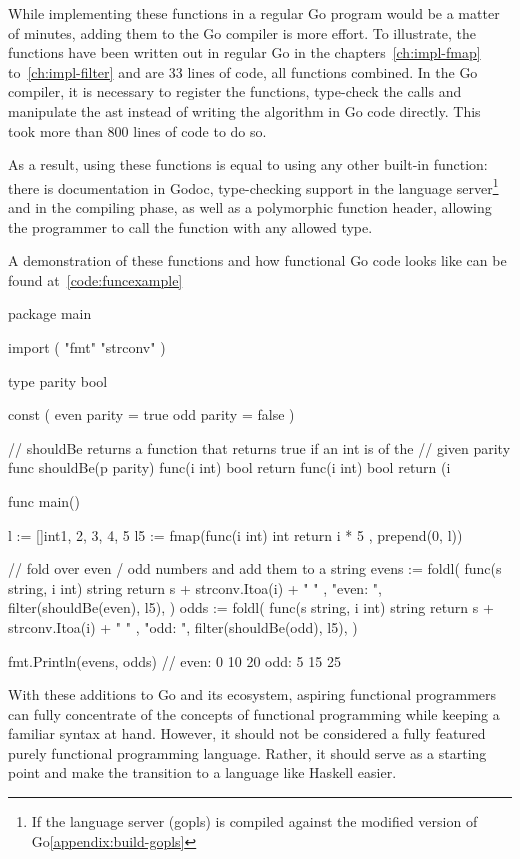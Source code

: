 While implementing these functions in a regular Go program would be a matter of minutes,
adding them to the Go compiler is more effort. To illustrate, the functions
have been written out in regular Go in the chapters~\ref{ch:impl-fmap} to~\ref{ch:impl-filter}
and are 33 lines of code, all functions combined. In the Go compiler, it is necessary to
register the functions, type-check the calls and manipulate the \gls{ast} instead of writing
the algorithm in Go code directly. This took more than 800 lines of code to do so.

As a result, using these functions is equal to using any other built-in function: there
is documentation in Godoc, type-checking support in the language server\footnote{If the
language server (gopls) is compiled against the modified version of Go\ref{appendix:build-gopls}}
and in the compiling phase, as well as a polymorphic function header, allowing the
programmer to call the function with any allowed type.

A demonstration of these functions and how functional Go code looks like can be found at~\ref{code:funcexample}

\begin{listing}[ht]
\begin{code}
	\label{code:funcexample}
\begin{gocode}
package main

import (
	"fmt"
	"strconv"
)

type parity bool

const (
	even parity = true
	odd  parity = false
)

// shouldBe returns a function that returns true if an int is of the
// given parity
func shouldBe(p parity) func(i int) bool {
	return func(i int) bool {
		return (i%
	}
}

func main() {
	l := []int{1, 2, 3, 4, 5}
	l5 := fmap(func(i int) int { return i * 5 }, prepend(0, l))

	// fold over even / odd numbers and add them to a string
	evens := foldl(
		func(s string, i int) string { return s + strconv.Itoa(i) + " " },
		"even: ",
		filter(shouldBe(even), l5),
	)
	odds := foldl(
		func(s string, i int) string { return s + strconv.Itoa(i) + " " },
		"odd: ",
		filter(shouldBe(odd), l5),
	)

	fmt.Println(evens, odds) // even: 0 10 20  odd: 5 15 25
}

\end{gocode}
\end{code}
\end{listing}

With these additions to Go and its ecosystem, aspiring functional programmers
can fully concentrate of the concepts of functional programming while keeping
a familiar syntax at hand. However, it should not be considered a fully featured
purely functional programming language. Rather, it should serve as a starting point and
make the transition to a language like Haskell easier.
